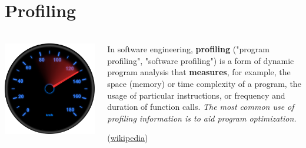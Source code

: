 \documentclass[9pt,xcolor=table]{beamer}
\begin{document}
\section[Profiling]{Profiling}
\begin{frame}
\frametitle{\insertsectionhead{}}
\begin{columns}[t]
  \begin{column}{.48\textwidth}
    \begin{center}
      \includegraphics[width=\textwidth]{img/kmh_speedometer}
    \end{center}
    \end{column}
    \begin{column}{.48\textwidth}
      \begin{center}
        In software engineering, \textbf{profiling} ("program profiling", "software profiling") is a form of dynamic program analysis that \textbf{measures}, for example, the space (memory) or time complexity of a program, the usage of particular instructions, or frequency and duration of function calls. \textit{The most common use of profiling information is to aid program optimization.}
      \end{center}
      \begin{flushright}
        \small(\href{http://en.wikipedia.org/wiki/Profiling_(computer_programming)}{wikipedia})
      \end{flushright}

    \end{column}
  \end{columns}
\end{frame}
\end{document}
